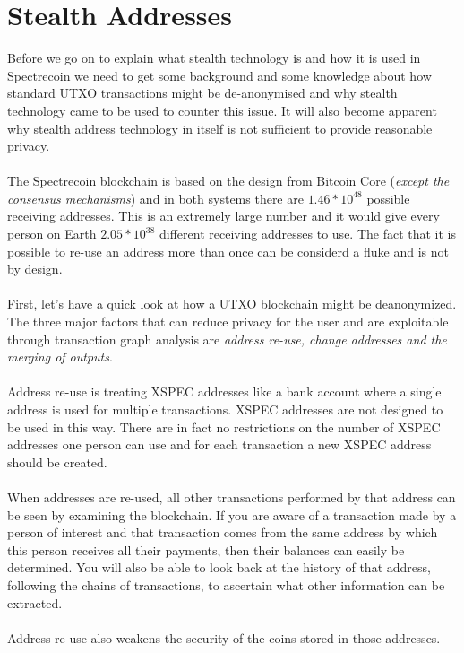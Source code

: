 \section{Stealth Addresses}
Before we go on to explain what stealth technology is and how it is used in
Spectrecoin we need to get some background and some knowledge about how
standard UTXO transactions might be de-anonymised and why stealth technology
came to be used to counter this issue. It will also become apparent why
stealth address technology in itself is not sufficient to provide reasonable
privacy.
\\
\\
\noindent
The Spectrecoin blockchain is based on the design from Bitcoin Core 
(\textit{except the consensus mechanisms}) and in both systems there are 
$1.46 \ast 10^{48}$ possible receiving addresses. This is an extremely 
large number and it would give every person on Earth $2.05 \ast 10^{38}$ 
different receiving addresses to use. The fact that it is possible
to re-use an address more than once can be considerd a fluke and is not by
design.
\\
\\
\noindent
First, let’s have a quick look at how a UTXO blockchain might be deanonymized.
The three major factors that can reduce privacy for the user and are exploitable
through transaction graph analysis are \textit{address re-use, change addresses 
and the merging of outputs}.
\\
\\
\noindent
Address re-use is treating XSPEC addresses like a bank account where a single
address is used for multiple transactions. XSPEC addresses are not designed to
be used in this way. There are in fact no restrictions on the number of XSPEC
addresses one person can use and for each transaction a new XSPEC address should
be created.
\\
\\
\noindent
When addresses are re-used, all other transactions performed by that address
can be seen by examining the blockchain. If you are aware of a transaction
made by a person of interest and that transaction comes from the same address
by which this person receives all their payments, then their balances can
easily be determined. You will also be able to look back at the history of
that address, following the chains of transactions, to ascertain what other
information can be extracted.
\\
\\
\noindent
Address re-use also weakens the security of the coins stored in those addresses.
